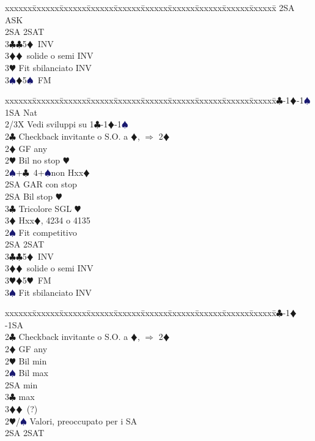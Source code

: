 \documentclass[a4paper,italian]{article}
\newcommand{\BC}{\textcolor{OliveGreen}{$\clubsuit$}}
\newcommand{\BD}{\textcolor{RedOrange}{$\vardiamondsuit$}}
\newcommand{\BH}{\textcolor{Red2}{$\varheartsuit${}}}
\newcommand{\BS}{\textcolor{MidnightBlue}{$\spadesuit${}}}
\newenvironment{bidtable}
{\begin{tabbing}

    xxxxxx\=xxxxxx\=xxxxxx\=xxxxxx\=xxxxxx\=xxxxxx\=xxxxxx\=xxxxxx\=xxxxxx\=xxxxxx\=\kill}
{\end{tabbing} }%
\begin{document}
\begin{multicols}{2}
\begin{bidtable}
        2SA \> ASK\-\\
        2SA \> 2SAT\\
        3\BC {}\BC 5\BD\ INV\\
        3\BD {}\BD\ solide o semi INV\\
        3\BH \> Fit sbilanciato INV\\
        3\BS {}\BD 5\BS\ FM\-
    \end{bidtable}
    \begin{bidtable}
        1\BC-1\BD-1\BS\+\\
        1SA \> Nat\+\\
        2/3X \> Vedi sviluppi su 1\BC -1\BD -1\BS \-\\
        2\BC \> Checkback invitante o S.O. a \BD , $\Rightarrow$ 2\BD \\
        2\BD \> GF any\+\\
        2\BH \> Bil no stop \BH \\
        2\BS {}+\BC\ 4+\BS non Hxx\BD \+\\
        2SA \> GAR con stop\-\\
        2SA \> Bil stop \BH \\
        3\BC \> Tricolore SGL \BH \\
        3\BD \> Hxx\BD, 4234 o 4135 \-\\
        [2pt]2\BS \> Fit competitivo\\
        2SA \> 2SAT\\
        3\BC {}\BC 5\BD\ INV\\
        3\BD {}\BD\ solide o semi INV\\
        3\BH {}\BD 5\BH\ FM\\
        3\BS \> Fit sbilanciato INV\-
    \end{bidtable}
    \begin{bidtable}
        1\BC-1\BD-1SA\+\\
        2\BC \> Checkback invitante o S.O. a \BD , $\Rightarrow$ 2\BD \\
        2\BD \> GF any\+\\
        2\BH \> Bil min\\
        2\BS \> Bil max\\
        2SA  min\\
        3\BC {} max\\
        3\BD {}\BD\ (?)\-\\
        [2pt]2\BH/\BS \> Valori, preoccupato per i SA\\
        2SA \> 2SAT\\

\end{bidtable}
\end{multicols}
\end{document}
